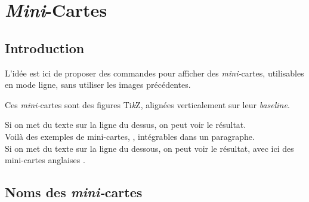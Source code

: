 \documentclass[a4paper]{article}
\providecommand\tikzlogo{Ti\textit{k}Z}
\let\TikZ\tikzlogo
\begin{document}
\section{\textit{Mini}-Cartes}

\subsection{Introduction}

\begin{codeidee}
L'idée est ici de proposer des commandes pour afficher des \textit{mini-}cartes, utilisables en mode ligne, sans utiliser les images précédentes.

\smallskip

Ces \textit{mini-}cartes sont des figures \TikZ, alignées verticalement sur leur \textit{baseline}.
\end{codeidee}

\begin{codetex}
\end{codetex}

\begin{codetex}[]
Si on met du texte sur la ligne du dessus, on peut voir le résultat.\\
Voilà des exemples de mini-cartes, , intégrables dans un paragraphe.\\
Si on met du texte sur la ligne du dessous, on peut voir le résultat, avec ici des mini-cartes anglaises .
\end{codetex}

\subsection{Noms des \textit{mini-}cartes}
\end{document}
